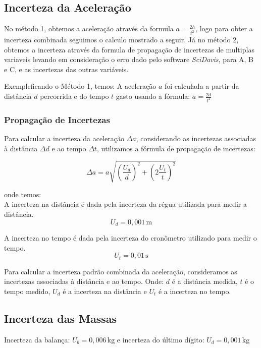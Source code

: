 \documentclass[a4papper, 10pt]{article}
\begin{document}
\subsection{Incerteza da Aceleração}

No método 1, obtemos a aceleração através da formula $a=\frac{2h}{t^{2}}$, logo para obter a incerteza combinada seguimos o calculo mostrado a seguir. Já no método 2, obtemos a incerteza através da formula de propagação de incertezas de multiplas variaveis levando em consideração o erro dado pelo software \textit{SciDavis}, para A, B e C, e as incertezas das outras variáveis.

Exempleficando o Método 1, temos:
A aceleração \( a \) foi calculada a partir da distância \( d \) percorrida e do tempo \( t \) gasto usando a fórmula:
$a = \frac{2d}{t^2}$

\subsubsection{Propagação de Incertezas}

Para calcular a incerteza da aceleração \( \Delta a \), considerando as incertezas associadas à distância \( \Delta d \) e ao tempo \( \Delta t \), utilizamos a fórmula de propagação de incertezas:

\[
\Delta a = a \sqrt{ \left( \frac{\textit{U}_d}{d} \right)^2 + \left( 2 \frac{\textit{U}_t}{t} \right)^2 }
\]

onde temos:
\\
A incerteza na distância é dada pela incerteza da régua utilizada para medir a distância.
\[
\textit{U}_d = 0{,}001 \, \text{m}
\]

A incerteza no tempo é dada pela incerteza do cronômetro utilizado para medir o tempo.
\[
\textit{U}_t = 0{,}01 \, \text{s}
\]


Para calcular a incerteza padrão combinada da aceleração, consideramos as incertezas associadas à distância e ao tempo. 
Onde: \( d \) é a distância medida,  \( t \) é o tempo medido,  \( \textit{U}_d \) é a incerteza na distância e \( \textit{U}_t \) é a incerteza no tempo.

\vspace{0.10 cm}
\subsection{Incerteza das Massas}

Incerteza da balança: \(\textit{U}_b = 0{,}006 \, \text{kg}\) e incerteza do último dígito: \(\textit{U}_d = 0{,}001 \, \text{kg}\)
\end{document}
